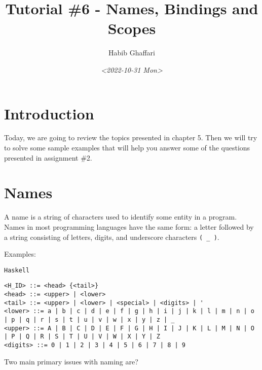 \documentclass[11pt]{article}
\author{Habib Ghaffari}
\date{\textit{<2022-10-31 Mon>}}
\title{Tutorial \#6 - Names, Bindings and Scopes}
\begin{document}
\maketitle
\tableofcontents



\section{Introduction}
\label{s1}
Today, we are going to review the topics presented in chapter 5. Then we will
try to solve some sample examples that will help you answer some of the
questions presented in assignment \#2.

\section{Names}
\label{s2}
A name is a string of characters used to identify some entity in a program.
Names in most programming languages have the same form: a letter followed by a
string consisting of letters, digits, and underscore characters \texttt{( \_ )}.

Examples:

\texttt{Haskell}
\begin{verbatim}
<H_ID> ::= <head> {<tail>}
<head> ::= <upper> | <lower>
<tail> ::= <upper> | <lower> | <special> | <digits> | '
<lower> ::= a | b | c | d | e | f | g | h | i | j | k | l | m | n | o | p | q | r | s | t | u | v | w | x | y | z | _
<upper> ::= A | B | C | D | E | F | G | H | I | J | K | L | M | N | O | P | Q | R | S | T | U | V | W | X | Y | Z
<digits> ::= 0 | 1 | 2 | 3 | 4 | 5 | 6 | 7 | 8 | 9
\end{verbatim}

Two main primary issues with naming are?
\end{document}
